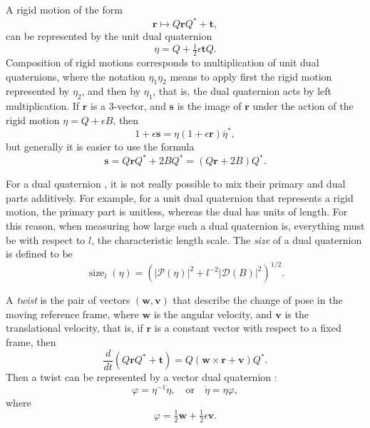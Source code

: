 \documentclass[reqno,12pt]{amsart}
\DeclareMathOperator\size{{size}}
\begin{document}
A rigid motion of the form
\begin{equation}
\label{rigid motion action}
\bm r \mapsto Q \bm r Q^* + \bm t,
\end{equation}
can be represented by the unit dual quaternion
\begin{equation}
\label{rigid motion as dual quaternion}
\eta = Q + \tfrac12 \epsilon \bm t Q.
\end{equation}
Composition of rigid motions corresponds to multiplication of unit dual quaternions, where the notation $\eta_1 \eta_2$ means to apply first the rigid motion represented by $\eta_2$, and then by $\eta_1$, that is, the dual quaternion acts by left multiplication.  If $\bm r$ is a 3-vector, and $\bm s$ is the image of $\bm r$ under the action of the rigid motion $\eta = Q + \epsilon B$, then
\begin{equation}
\label{defn of rigid motion on 3-vector}
1 + \epsilon \bm s = \eta (1 + \epsilon \bm r) \overline\eta^* ,
\end{equation}
but generally it is easier to use the formula
\begin{equation}
\label{rigid motion on 3-vector}
\bm s = Q \bm r Q^* + 2 B Q^* = (Q \bm r + 2 B) Q^* .
\end{equation}

For a dual quaternion , it is not really possible to mix their primary and dual parts additively.  For example, for a unit dual quaternion that represents a rigid motion, the primary part is unitless, whereas the dual has units of length.  For this reason, when measuring how large such a dual quaternion is, everything must be with respect to $l$, the characteristic length scale.  The \emph{size} of a dual quaternion is defined to be
\begin{equation}
\label{size}
\size_{l}(\eta) = \left(|\mathcal P(\eta)|^2 + l^{-2}|\mathcal D(B)|^2\right)^{1/2}.
\end{equation}

A \emph{twist} is the pair of vectors $(\bm w, \bm v)$ that describe the change of pose in the moving reference frame, where $\bm w$ is the angular velocity, and $\bm v$ is the translational velocity, that is, if $\bm r$ is a constant vector with respect to a fixed frame, then
\begin{equation}
\label{ode twist}
\frac d{dt} (Q \bm r Q^* + \bm t) = Q (\bm w \times \bm r + \bm v) Q^* .
\end{equation}
Then a twist can be represented by a vector dual quaternion \cite{adorno, agrawal}:
\begin{equation}
\label{ode dual quaternion}
\varphi = \eta^{-1} \dot \eta, \quad\text{or}\quad\dot \eta = \eta \varphi ,
\end{equation}
where
\begin{equation}
\label{twist as dual quaternion}
\varphi = \tfrac12 \bm w + \tfrac12 \epsilon \bm v .
\end{equation}
\end{document}
